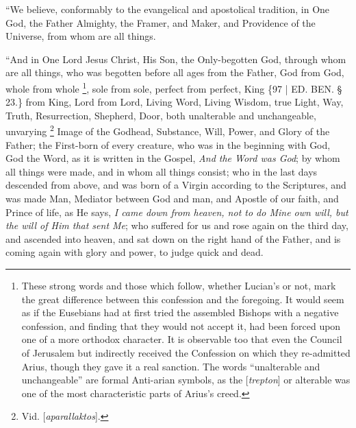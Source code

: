 ``We believe, conformably to
the evangelical and apostolical tradition, in One God, the Father
Almighty, the Framer, and Maker, and Providence of the Universe, from
whom are all things.

``And in One Lord Jesus Christ,
His Son, the Only-begotten God, through whom are all things, who was
begotten before all ages from the Father, God from God, whole from
whole \footnote{These strong words and those which follow, whether Lucian's or not,
mark the great difference between this confession and the foregoing.
It would seem as if the Eusebians had at first tried the assembled
Bishops with a negative confession, and finding that they would not
accept it, had been forced upon one of a more orthodox character. It
is observable too that even the Council of Jerusalem but indirectly
received the Confession on which they re-admitted Arius, though they
gave it a real sanction. The words ``unalterable and unchangeable'' are
formal Anti-arian symbols, as the [\emph{trepton}] or alterable was
one of the most characteristic parts of Arius's creed.}, sole from sole,
perfect from perfect, King \{97 | ED. BEN.
§ 23.\} from King, Lord from Lord, Living Word, Living Wisdom, true
Light, Way, Truth, Resurrection, Shepherd, Door, both unalterable and
unchangeable, unvarying \footnote{Vid. [\emph{aparallaktos}].}
Image of the Godhead, Substance, Will, Power, and Glory of the Father;
the First-born of every creature, who was in the beginning with God,
God the Word, as it is written in the Gospel, \emph{And the Word was God};
by whom all things were made, and in whom all things consist; who in
the last days descended from above, and was born of a Virgin according
to the Scriptures, and was made Man, Mediator between God and man, and
Apostle of our faith, and Prince of life, as He says, \emph{I came down
from heaven, not to do Mine own will, but the will of Him that sent Me};
who suffered for us and rose again on the third day, and ascended into
heaven, and sat down on the right hand of the Father, and is coming
again with glory and power, to judge quick and dead.

